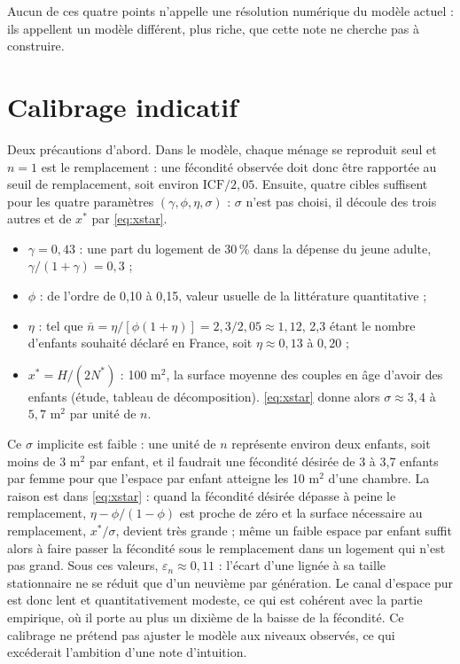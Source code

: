 \documentclass[11pt,a4paper]{article}
\theoremstyle{plain}
\theoremstyle{definition}
\newcommand{\eps}{\varepsilon}
\begin{document}
Aucun de ces quatre points n'appelle une résolution numérique du modèle actuel : ils appellent un modèle différent, plus riche, que cette note ne cherche pas à construire.

\section{Calibrage indicatif}\label{sec:calibrage}

Deux précautions d'abord. Dans le modèle, chaque ménage se reproduit seul et $n = 1$ est le remplacement : une fécondité observée doit donc être rapportée au seuil de remplacement, soit environ $\text{ICF}/2{,}05$. Ensuite, quatre cibles suffisent pour les quatre paramètres $(\gamma, \phi, \eta, \sigma)$ : $\sigma$ n'est pas choisi, il découle des trois autres et de $x^*$ par \eqref{eq:xstar}.
\begin{itemize}
\item $\gamma = 0{,}43$ : une part du logement de 30\,\% dans la dépense du jeune adulte, $\gamma/(1+\gamma) = 0{,}3$ ;
\item $\phi$ : de l'ordre de 0,10 à 0,15, valeur usuelle de la littérature quantitative ;
\item $\eta$ : tel que $\bar n = \eta/[\phi(1+\eta)] = 2{,}3/2{,}05 \approx 1{,}12$, 2,3 étant le nombre d'enfants souhaité déclaré en France, soit $\eta \approx 0{,}13$ à $0{,}20$ ;
\item $x^* = H/(2N^*)$ : 100 m$^2$, la surface moyenne des couples en âge d'avoir des enfants (étude, tableau de décomposition). \eqref{eq:xstar} donne alors $\sigma \approx 3{,}4$ à $5{,}7$ m$^2$ par unité de $n$.
\end{itemize}

Ce $\sigma$ implicite est faible : une unité de $n$ représente environ deux enfants, soit moins de 3 m$^2$ par enfant, et il faudrait une fécondité désirée de 3 à 3,7 enfants par femme pour que l'espace par enfant atteigne les 10 m$^2$ d'une chambre. La raison est dans \eqref{eq:xstar} : quand la fécondité désirée dépasse à peine le remplacement, $\eta - \phi/(1-\phi)$ est proche de zéro et la surface nécessaire au remplacement, $x^*/\sigma$, devient très grande ; même un faible espace par enfant suffit alors à faire passer la fécondité sous le remplacement dans un logement qui n'est pas grand. Sous ces valeurs, $\eps_n \approx 0{,}11$ : l'écart d'une lignée à sa taille stationnaire ne se réduit que d'un neuvième par génération. Le canal d'espace pur est donc lent et quantitativement modeste, ce qui est cohérent avec la partie empirique, où il porte au plus un dixième de la baisse de la fécondité. Ce calibrage ne prétend pas ajuster le modèle aux niveaux observés, ce qui excéderait l'ambition d'une note d'intuition.
\end{document}
